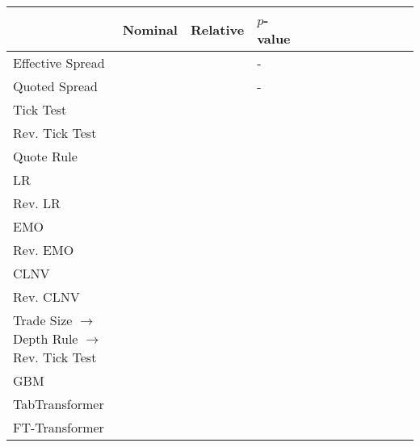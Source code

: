 \begin{tabular}{lllllllllllll}
    \toprule
                                                     & Nominal & Relative & $p$-value \\ \midrule
    Effective Spread                                 &         &          & -         \\
    Quoted Spread                                    &         &          & -         \\
    Tick Test                                        &         &          &           \\
    Rev. Tick Test                                   &         &          &           \\
    Quote Rule                                       &         &          &           \\
    \gls{LR}                                         &         &          &           \\
    Rev. \gls{LR}                                    &         &          &           \\
    \gls{EMO}                                        &         &          &           \\
    Rev. \gls{EMO}                                   &         &          &           \\
    \gls{CLNV}                                       &         &          &           \\
    Rev. \gls{CLNV}                                  &         &          &           \\
    Trade Size $\to$ Depth Rule $\to$ Rev. Tick Test &         &          &           \\
    \gls{GBM}                                        &         &          &           \\
    TabTransformer                                   &         &          &           \\
    FT-Transformer                                   &         &          &           \\ \bottomrule
\end{tabular}